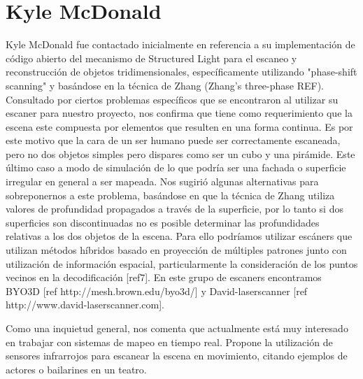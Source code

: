 \section{Kyle McDonald}
Kyle McDonald\cite{KyleMcDonald} fue contactado inicialmente en referencia a su implementación de código abierto del mecanismo de Structured Light para el escaneo y reconstrucción de objetos tridimensionales, específicamente utilizando "phase-shift scanning" y basándose en la técnica de Zhang (Zhang's three-phase REF). Consultado por ciertos problemas específicos que se encontraron al utilizar su escaner para nuestro proyecto, nos confirma que tiene como requerimiento que la escena este compuesta por elementos que resulten en una forma continua. Es por este motivo que la cara de un ser humano puede ser correctamente escaneada, pero no dos objetos simples pero dispares como ser un cubo y una pirámide. Este último caso a modo de simulación de lo que podría ser una fachada o superficie irregular en general a ser mapeada. Nos sugirió algunas alternativas para sobreponernos a este problema, basándose en que la técnica de Zhang utiliza valores de profundidad propagados a través de la superficie, por lo tanto si dos superficies son discontinuadas no es posible determinar las profundidades relativas a los dos objetos de la escena. Para ello podríamos utilizar escáners que utilizan métodos híbridos basado en proyección de múltiples patrones junto con utilización de información espacial, particularmente la consideración de los puntos vecinos en la decodificación [ref7]. En este grupo de escaners encontramos BYO3D [ref http://mesh.brown.edu/byo3d/] y David-laserscanner [ref http://www.david-laserscanner.com].

Como una inquietud general, nos comenta que actualmente está muy interesado en trabajar con sistemas de mapeo en tiempo real. Propone la utilización de sensores infrarrojos para escanear la escena en movimiento, citando ejemplos de actores o bailarines en un teatro.